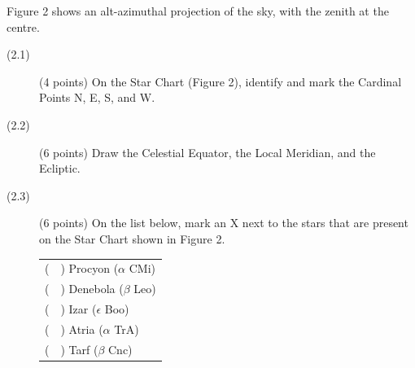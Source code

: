 Figure 2 shows an alt-azimuthal projection of the sky, with the zenith at the
centre.


\begin{description}
\item[(2.1)] (4 points) On the Star Chart (Figure 2), identify and mark the
  Cardinal Points N, E, S, and W.
\item[(2.2)] (6 points) Draw the Celestial Equator, the Local Meridian, and
  the Ecliptic.
\item[(2.3)] (6 points) On the list below, mark an X next to the stars that
  are present on the Star Chart shown in Figure 2.

  \begin{tabular}{l}
  (\ \ ) Procyon ($\alpha$ CMi) \\
  (\ \ ) Denebola ($\beta$ Leo) \\
  (\ \ ) Izar ($\epsilon$ Boo) \\
  (\ \ ) Atria ($\alpha$ TrA) \\
  (\ \ ) Tarf ($\beta$ Cnc) \\
  \end{tabular}
\end{description}
